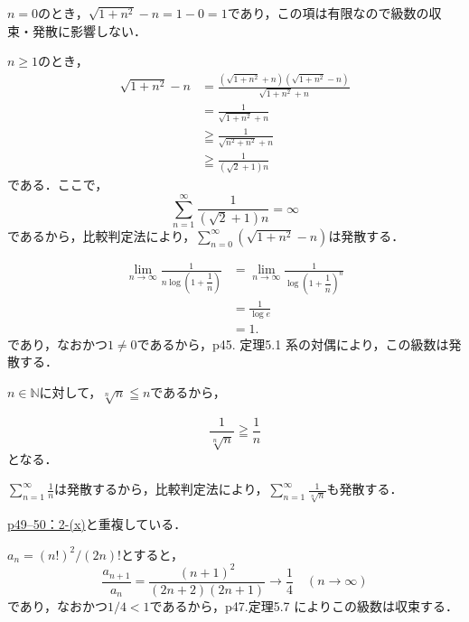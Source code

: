 
\begin{tanswer}
    $n =0$のとき，$\sqrt{1+n^2}-n =1-0= 1$であり，この項は有限なので級数の収束・発散に影響しない．

    $n \geq 1$のとき，
    \begin{align*}
        \sqrt{1+n^2}-n & = \frac{(\sqrt{1+n^2}+n)(\sqrt{1+n^2}-n)}{\sqrt{1+n^2}+n} \\
                       & = \frac{1}{\sqrt{1+n^2}+n}                                \\
                       & \geqq \frac{1}{\sqrt{n^2+n^2}+n}                          \\
                       & \geqq \frac{1}{(\sqrt{2}+1)n}
    \end{align*}
    である．ここで，
    \[
        \sum_{n=1}^{\infty} \frac{1}{(\sqrt{2}+1)n} =\infty
    \]
    であるから，比較判定法により，$ \sum_{n=0}^{\infty} ( \sqrt{1+n^2}-n )$は発散する．
\end{tanswer}


\begin{tanswer}
\begin{align*}
\lim_{n \to \infty} \frac{1}{n \log \left(1+\dfrac{1}{n}\right)} &= \lim_{n \to \infty} \frac{1}{\log \left(1+\dfrac{1}{n}\right)^n}\\
&=\frac{1}{\log e} \\
& = 1.
\end{align*}
であり，なおかつ$ 1 \ne 0$であるから，p45. 定理5.1 系の対偶により，この級数は発散する．
\end{tanswer}



\begin{tanswer}
    $n \in \mathbb{N}$に対して，$ \sqrt[n]{n} \leqq n$であるから，

    \[
        \frac{1}{\sqrt[n]{n}} \geqq \frac{1}{n}
    \]
    となる．

    $ \sum_{n=1}^{\infty} \frac{1}{n}$は発散するから，比較判定法により，$ \sum_{n=1}^{\infty} \frac{1}{\sqrt[n]{n}}$も発散する．
\end{tanswer}


\hyperref[p49--50：2-(x)]{p49--50：2-(x)}と重複している．


\begin{tanswer}
  $a_n = (n !)^2 / (2n)!$とすると，
    \[
        \frac{a_{n+1}}{a_n} = \frac{(n+1)^2}{(2n+2)(2n+1)} \to \frac{1}{4} \quad (n \to \infty)
    \]
    であり，なおかつ$1/4 < 1$であるから，p47.定理5.7 によりこの級数は収束する．
\end{tanswer}